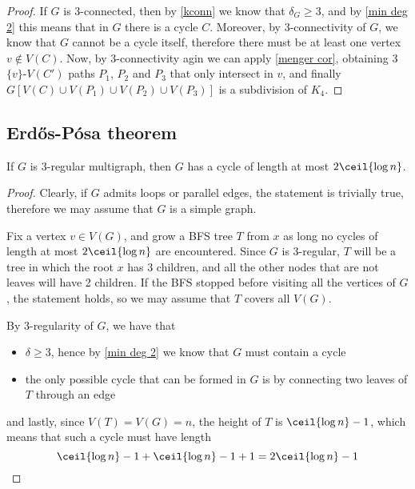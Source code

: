 \documentclass[a4paper, 12pt]{report}
\begin{document}
    \begin{proof}
        If $G$ is 3-connected, then by \cref{kconn} we know that $\delta_G \ge 3$, and by \cref{min deg 2} this means that in $G$ there is a cycle $C$. Moreover, by 3-connectivity of $G$, we know that $G$ cannot be a cycle itself, therefore there must be at least one vertex $v \notin V(C)$. Now, by 3-connectivity agin we can apply \cref{menger cor}, obtaining 3 $\{v\}$-$V(C')$ paths $P_1$, $P_2$ and $P_3$ that only intersect in $v$, and finally $G[V(C) \cup V(P_1) \cup V(P_2) \cup V(P_3)]$ is a subdivision of $K_4$.
    \end{proof}

    \subsection{Erdős-Pósa theorem}

    \begin{framedprop}{}
        If $G$ is 3-regular multigraph, then $G$ has a cycle of length at most $2 \ceil{\log n}$.
    \end{framedprop}

    \begin{proof}
        Clearly, if $G$ admits loops or parallel edges, the statement is trivially true, therefore we may assume that $G$ is a simple graph.

        Fix a vertex $v \in V(G)$, and grow a BFS tree $T$ from $x$ as long no cycles of length at most $2 \ceil{\log n}$ are encountered. Since $G$ is 3-regular, $T$ will be a tree in which the root $x$ has 3 children, and all the other nodes that are not leaves will have 2 children. If the BFS stopped before visiting all the vertices of $G$, the statement holds, so we may assume that $T$ covers all $V(G)$.

        By 3-regularity of $G$, we have that

        \begin{itemize}
            \item $\delta \ge 3$, hence by \cref{min deg 2} we know that $G$ must contain a cycle
            \item the only possible cycle that can be formed in $G$ is by connecting two leaves of $T$ through an edge
        \end{itemize}

        and lastly, since $V(T) = V(G) = n$, the height of $T$ is $\ceil{\log n} - 1$, which means that such a cycle must have length $$\ceil{\log n} - 1 + \ceil{\log n} - 1 + 1 = 2 \ceil{\log n} - 1$$
    \end{proof}
\end{document}
